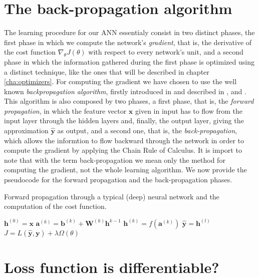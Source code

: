 	\section{The back-propagation algorithm} %
	\label{sec:the_back-propagation_algorithm}
		\noindent
		The learning procedure for our ANN essentialy consist in two distinct phases, the first phase in which we
		compute the network's \textit{gradient}, that is, the derivative of the cost function
		$\nabla_{\theta} J(\theta)$ with respect to every network's unit, and a second phase in which the
		information gathered during the first phase is optimized using a distinct technique, like the ones
		that will be described in chapter \ref{cha:optimizers}. For computing the gradient we have chosen to use
		the well known \textit{backpropagation algorithm}, firstly introduced in \cite{10028086174} and described
		in \cite{Goodfellow-et-al-2016}, \cite{haykin2009neural} and \cite{mitchell1997machine}. This algorithm is
		also composed by two phases, a first phase, that is, the \textit{forward propagation}, in which the
		feature vector $\mathbf{x}$ given in input has to flow from the input layer through the hidden layers and,
		finally, the output layer, giving the approximation $\hat{\mathbf{y}}$ as output, and a second one, that
		is, the \textit{back-propagation}, which allows the informtion to flow backward through the network in
		order to compute the gradient by applying the Chain Rule of Calculus. It is import to note that with the
		term back-propagation we mean only the method for computing the gradient, not the whole learning algorithm.
		We now provide the pseudocode for the forward propagation and the back-propagation phases.

		\begin{algorithm}
			\caption{Forward propagation through a typical (deep) neural network and the computation of the cost
			function.}
			\label{alg:forward_propagation}
			\begin{algorithmic}[1]
					\State $\mathbf{h}^{(0)} = \mathbf{x}$
						\State $\mathbf{a}^{(k)} = \mathbf{b}^{(k)} + \mathbf{W}^{(k)}\mathbf{h}^{k - 1}$
						\State $\mathbf{h}^{(k)} = f(\mathbf{a}^{(k)})$
					\EndFor
					\State $\hat{\mathbf{y}} = \mathbf{h}^{(l)}$
					\State $J = L(\hat{\mathbf{y}}, \mathbf{y}) + \lambda \Omega(\theta)$
				\EndProcedure
			\end{algorithmic}
		\end{algorithm}

	\section{Loss function is differentiable?} %
	\label{sec:loss_function_is_differentiable_}



